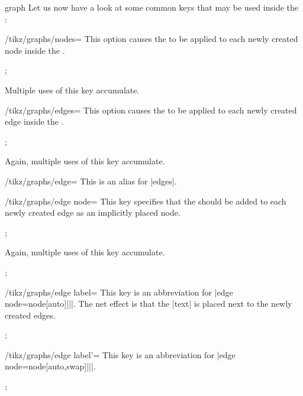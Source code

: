 \begin{pathoperation}{graph}{}
  Let us now have a look at some common keys that may be used inside
  the :
  \begin{key}{/tikz/graphs/nodes=}
    This option causes the  to be applied to each newly
    created node inside the .
    \begin{codeexample}[]
\tikz {};      
    \end{codeexample}
    Multiple uses of this key accumulate.
  \end{key}
  \begin{key}{/tikz/graphs/edges=}
    This option causes the  to be applied to each newly
    created edge inside the .
    \begin{codeexample}[]
\tikz {};      
    \end{codeexample}
    Again, multiple uses of this key accumulate.
  \end{key}
  \begin{key}{/tikz/graphs/edge=}
    This is an alias for |edges|.
  \end{key}
  
  \begin{key}{/tikz/graphs/edge node=}
    This key specifies that the  should be
    added to each newly created edge as an implicitly placed node. 
    \begin{codeexample}[]
\tikz {};      
    \end{codeexample}
    Again, multiple uses of this key accumulate.
    \begin{codeexample}[]
\tikz {};      
    \end{codeexample}
  \end{key}
  
  \begin{key}{/tikz/graphs/edge label=}
    This key is an abbreviation for
    |edge node=node[auto]{||}|. The net effect is that the
    |text| is placed next to the newly created edges.
    \begin{codeexample}[]
\tikz {};      
    \end{codeexample}
  \end{key}
  
  \begin{key}{/tikz/graphs/edge label'=}
    This key is an abbreviation for
    |edge node=node[auto,swap]{||}|. 
    \begin{codeexample}[]
\tikz {};      
    \end{codeexample}
  \end{key}  
\end{pathoperation}


